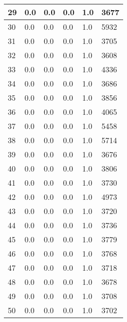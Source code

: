 \begin{longtable}{|l|l|l|l|l|l|}
29 & 0.0 & 0.0 & 0.0 & 1.0 & 3677 \\ \hline 
30 & 0.0 & 0.0 & 0.0 & 1.0 & 5932 \\ \hline 
31 & 0.0 & 0.0 & 0.0 & 1.0 & 3705 \\ \hline 
32 & 0.0 & 0.0 & 0.0 & 1.0 & 3608 \\ \hline 
33 & 0.0 & 0.0 & 0.0 & 1.0 & 4336 \\ \hline 
34 & 0.0 & 0.0 & 0.0 & 1.0 & 3686 \\ \hline 
35 & 0.0 & 0.0 & 0.0 & 1.0 & 3856 \\ \hline 
36 & 0.0 & 0.0 & 0.0 & 1.0 & 4065 \\ \hline 
37 & 0.0 & 0.0 & 0.0 & 1.0 & 5458 \\ \hline 
38 & 0.0 & 0.0 & 0.0 & 1.0 & 5714 \\ \hline 
39 & 0.0 & 0.0 & 0.0 & 1.0 & 3676 \\ \hline 
40 & 0.0 & 0.0 & 0.0 & 1.0 & 3806 \\ \hline 
41 & 0.0 & 0.0 & 0.0 & 1.0 & 3730 \\ \hline 
42 & 0.0 & 0.0 & 0.0 & 1.0 & 4973 \\ \hline 
43 & 0.0 & 0.0 & 0.0 & 1.0 & 3720 \\ \hline 
44 & 0.0 & 0.0 & 0.0 & 1.0 & 3736 \\ \hline 
45 & 0.0 & 0.0 & 0.0 & 1.0 & 3779 \\ \hline 
46 & 0.0 & 0.0 & 0.0 & 1.0 & 3768 \\ \hline 
47 & 0.0 & 0.0 & 0.0 & 1.0 & 3718 \\ \hline 
48 & 0.0 & 0.0 & 0.0 & 1.0 & 3678 \\ \hline 
49 & 0.0 & 0.0 & 0.0 & 1.0 & 3708 \\ \hline 
50 & 0.0 & 0.0 & 0.0 & 1.0 & 3702 \\ \hline 
\end{longtable}